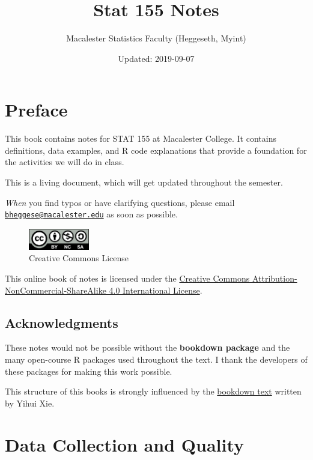 \documentclass[]{book}
\title{Stat 155 Notes}
\author{Macalester Statistics Faculty (Heggeseth, Myint)}
\date{Updated: 2019-09-07}
\begin{document}
\maketitle

{
\setcounter{tocdepth}{2}
\tableofcontents
}
\hypertarget{preface}{%
\chapter*{Preface}\label{preface}}


This book contains notes for STAT 155 at Macalester College. It contains definitions, data examples, and R code explanations that provide a foundation for the activities we will do in class.

This is a living document, which will get updated throughout the semester.

\emph{When} you find typos or have clarifying questions, please email \href{mailto:bheggese@macalester.edu}{\nolinkurl{bheggese@macalester.edu}} as soon as possible.

\begin{figure}
\centering
\includegraphics[width=1.04167in,height=\textheight]{Photos/by-nc-sa.png}
\caption{Creative Commons License}
\end{figure}

This online book of notes is licensed under the \href{http://creativecommons.org/licenses/by-nc-sa/4.0/}{Creative Commons Attribution-NonCommercial-ShareAlike 4.0 International License}.

\hypertarget{acknowledgments}{%
\section{Acknowledgments}\label{acknowledgments}}

These notes would not be possible without the \textbf{bookdown package} and the many open-course R packages used throughout the text. I thank the developers of these packages for making this work possible.

This structure of this books is strongly influenced by the \href{https://bookdown.org/yihui/bookdown}{bookdown text} written by Yihui Xie.

\hypertarget{data-collection-and-quality}{%
\chapter{Data Collection and Quality}\label{data-collection-and-quality}}
\end{document}
